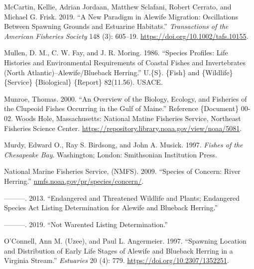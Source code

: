 \documentclass[
]{book}
\newlength{\cslhangindent}
\newlength{\cslentryspacingunit} %
\newenvironment{CSLReferences}[2] %
 {%
  \setlength{\parindent}{0pt}
  \ifodd #1
  \let\oldpar\par
  \def\par{\hangindent=\cslhangindent\oldpar}
  \fi
  \setlength{\parskip}{#2\cslentryspacingunit}
 }%
 {}
\begin{document}
\begin{CSLReferences}{1}{0}
\leavevmode{}%
McCartin, Kellie, Adrian Jordaan, Matthew Sclafani, Robert Cerrato, and Michael G. Frisk. 2019. {``A {New} {Paradigm} in {Alewife} {Migration}: {Oscillations} Between {Spawning} {Grounds} and {Estuarine} {Habitats}.''} \emph{Transactions of the American Fisheries Society} 148 (3): 605--19. \url{https://doi.org/10.1002/tafs.10155}.

\leavevmode{}%
Mullen, D. M., C. W. Fay, and J. R. Moring. 1986. {``Species Profiles: Life Histories and Environmental Requirements of Coastal Fishes and Invertebrates ({North} {Atlantic})--Alewife/Blueback Herring.''} U.\{S\}. \{Fish\} and \{Wildlife\} \{Service\} \{Biological\} \{Report\} 82(11.56). USACE.

\leavevmode{}%
Munroe, Thomas. 2000. {``An Overview of the Biology, Ecology, and Fisheries of the Clupeoid Fishes Occurring in the {Gulf} of {Maine}.''} Reference \{Document\} 00-02. Woods Hole, Massachusetts: National Matine Fisheries Service, Northeast Fisheries Science Center. \url{https://repository.library.noaa.gov/view/noaa/5081}.

\leavevmode{}%
Murdy, Edward O., Ray S. Birdsong, and John A. Musick. 1997. \emph{Fishes of the {Chesapeake} {Bay}}. Washington; London: Smithsonian Institution Press.

\leavevmode{}%
National Marine Fisheries Service, (NMFS). 2009. {``Species of Concern: River Herring.''} \href{https://nmfs.noaa.gov/pr/species/concern/}{nmfs.noaa.gov/pr/species/concern/}.

\leavevmode{}%
---------. 2013. {``Endangered and Threatened Wildlife and Plants; Endangered Species Act Listing Determination for Alewife and Blueback Herring.''}

\leavevmode{}%
---------. 2019. {``Not {Warented} {Listing} {Determination}.''}

\leavevmode{}%
O'Connell, Ann M. (Uzee), and Paul L. Angermeier. 1997. {``Spawning {Location} and {Distribution} of {Early} {Life} {Stages} of {Alewife} and {Blueback} {Herring} in a {Virginia} {Stream}.''} \emph{Estuaries} 20 (4): 779. \url{https://doi.org/10.2307/1352251}.


\end{CSLReferences}
\end{document}
